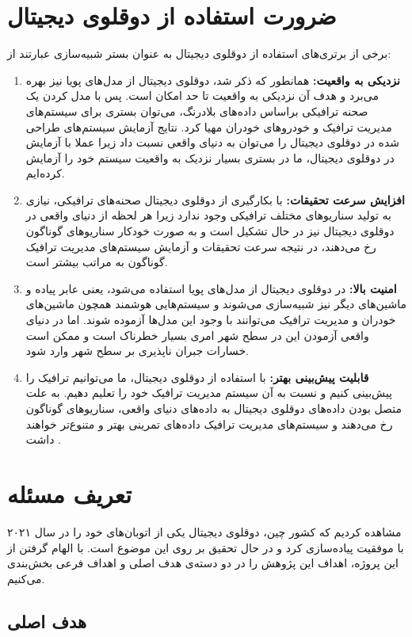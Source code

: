 \section{ضرورت استفاده از دوقلوی دیجیتال}
برخی از برتری‌های استفاده از دوقلوی دیجیتال به عنوان بستر شبیه‌سازی عبارتند از:

\begin{enumerate}
	\item \textbf{نزدیکی به واقعیت:} همانطور که ذکر شد، دوقلوی دیجیتال از مدل‌های پویا نیز بهره می‌برد و هدف آن نزدیکی به واقعیت تا حد امکان است. پس با مدل کردن یک صحنه ترافیکی براساس داده‌های بلادرنگ، می‌توان بستری برای سیستم‌های مدیریت ترافیک و خود‌رو‌های خودران مهیا کرد. نتایج آزمایش سیستم‌های طراحی شده در دوقلوی دیجیتال را می‌توان به دنیای واقعی نسبت داد زیرا عملا با آزمایش در دوقلوی دیجیتال، ما در بستری بسیار نزدیک به واقعیت سیستم‌ خود را آزمایش کرده‌ایم.
	\item \textbf{افزایش سرعت تحقیقات:} با بکارگیری از دوقلوی دیجیتال صحنه‌های ترافیکی، نیازی به تولید سناریو‌های مختلف ترافیکی وجود ندارد زیرا هر لحظه از دنیای واقعی در دوقلوی دیجیتال نیز در حال تشکیل است و به صورت خودکار سناریو‌های گوناگون رخ می‌دهند، در نتیجه سرعت تحقیقات و آزمایش سیستم‌های مدیریت ترافیک گوناگون به مراتب بیشتر است.
	\item \textbf{امنیت بالا:} در دوقلوی دیجیتال از مدل‌های پویا استفاده می‌شود، یعنی عابر پیاده و ماشین‌های دیگر نیز شبیه‌سازی می‌شوند و سیستم‌هایی هوشمند همچون ماشین‌های خودران و مدیریت ترافیک می‌توانند با وجود این مدل‌ها آزموده شوند. اما در دنیای واقعی آزمودن این در سطح شهر امری بسیار خطرناک است و ممکن است خسارات جبران ناپذیری بر سطح شهر وارد شود.
	\item \textbf{قابلیت پیش‌بینی بهتر:} با استفاده از دوقلوی دیجیتال، ما می‌توانیم ترافیک‌ را پیش‌بینی کنیم و نسبت به آن سیستم مدیریت ترافیک خود را تعلیم دهیم. به علت متصل بودن داده‌های دوقلوی دیجیتال به داده‌های دنیای واقعی، سناریو‌های گوناگون رخ می‌دهند و سیستم‌های مدیریت ترافیک داده‌های تمرینی بهتر و متنوع‌تر خواهند داشت \cite{singh2021digital}.
\end{enumerate}

\section{تعریف مسئله}
مشاهده کردیم که کشور چین، دوقلوی دیجیتال یکی از اتوبان‌های خود را در سال ۲۰۲۱ با موفقیت پیاده‌سازی کرد و در حال تحقیق بر روی این موضوع است. با الهام گرفتن از این پروژه، اهداف این پژوهش را در دو دسته‌ی هدف اصلی و اهداف فرعی بخش‌بندی می‌کنیم.

\subsection{هدف اصلی}

